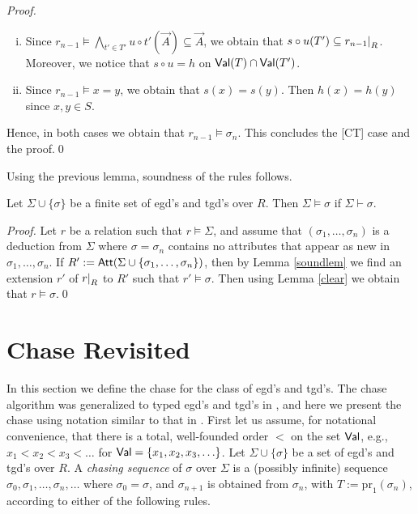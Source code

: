 \documentclass[envcountset]{llncs}
\newcommand{\problemFont}[1]{\protect\ensuremath{\mathsf{#1}}}
\newcommand{\si}{\sigma}
\newcommand{\Si}{\Sigma}
\newcommand{\sub}{\subseteq}
\newcommand{\pr}{\mathrm{pr}}
\newcommand{\tuple}[1]{\vec{#1}}
\newcommand{\at}{\problemFont{Att}}
\newcommand\re[2]{{\left.\kern-\nulldelimiterspace #1 \vphantom{|} \right|_{#2} }}
\newcommand{\Val}{\problemFont{Val}}
\begin{document}
\begin{proof}
\begin{enumerate}[(i)]
\item  Since $ r_{n-1}\models \bigwedge_{t'\in T'} u\circ t'(\tuple A)\sub \tuple A$,  we obtain that $s\circ u(T') \sub \re{r_{n-1}}{R}$. Moreover, we notice that $s\circ u = h$ on $\Val(T) \cap \Val(T')$. 

\item Since  $ r_{n-1}\models x=y$, we obtain that $s(x)=s(y)$. Then $h(x)=h(y)$ since  $x,y\in S$. 

\end{enumerate}
Hence, in both cases we obtain that $r_{n-1}\models \si_n$. This concludes the [CT] case and the proof.\qed


   

\end{proof}

Using the previous lemma,  soundness of the rules follows.

\begin{theorem}
Let $\Si\cup\{\si\}$ be a finite set of egd's and tgd's over $R$. Then $\Si \models \si$ if $\Si \vdash \si$.
\end{theorem}
\begin{proof}
Let $r$ be a relation such that $r\models \Si$, and assume that $(\si_1, \ldots ,\si_n)$ is a deduction from $\Si$ where $\si=\si_n$ contains no attributes that appear as new in $\si_1, \ldots ,\si_n$.  If $R':=\at(\Si\cup\{\si_1, \ldots ,\si_n\})$, then by Lemma   \ref{soundlem}  we find an extension $r'$ of $\re{r}{R}$ to $R'$ such that $r'\models \si$. Then using Lemma \ref{clear} we obtain that $r\models \si$.\qed
\end{proof}



\section{Chase Revisited}\label{chasing}
In this section we define the chase for the class of egd's and tgd's. The chase algorithm was generalized to typed egd's and tgd's in \cite{beeri84}, and here we present the chase using notation similar to that in \cite{abiteboul95}. First let us assume, for notational convenience,  that there is a total, well-founded order $<$ on the set $\Val$, e.g., $x_1<x_2<x_3<\ldots $ for $\Val=\{x_1, x_2, x_3,\ldots  \}$. Let $\Si\cup\{\si\}$ be a set of egd's and tgd's over $R$. A \emph{chasing sequence} of $\si$ over $\Si$ is a (possibly infinite) sequence $\si_0,\si_1, \ldots ,\si_n,\ldots $ where 
$\si_0=\si$, and
$\si_{n+1}$ is obtained from $\si_n$, with $T:=\pr_1(\si_n)$, according to either of the following rules.
\end{document}
